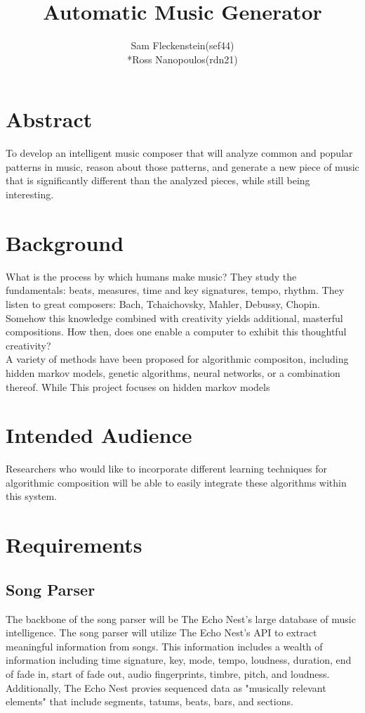 \documentclass{article}
\begin{document}
\title{Automatic Music Generator}
\author{Sam Fleckenstein(sef44)\\*Ross Nanopoulos(rdn21)}
\maketitle
\newpage

\tableofcontents
\newpage

\section{Abstract}
To develop an intelligent music composer that will analyze common and popular patterns in music, reason about those patterns, and generate a new piece of music that is significantly different than the analyzed pieces, while still being interesting.

\section{Background}
What is the process by which humans make music?  They study the fundamentals: beats, measures, time and key signatures, tempo, rhythm.  They listen to great composers: Bach, Tchaichovsky, Mahler, Debussy, Chopin.  Somehow this knowledge combined with creativity yields additional, masterful compositions.  How then, does one enable a computer to exhibit this thoughtful creativity?
\\
A variety of methods have been proposed for algorithmic compositon, including hidden markov models, genetic algorithms, neural networks, or a combination thereof.  While This project focuses on hidden markov models 

\section{Intended Audience}
Researchers who would like to incorporate different learning techniques for algorithmic composition will be able to easily integrate these algorithms within this system.

\section{Requirements}
\subsection{Song Parser}
The backbone of the song parser will be The Echo Nest's large database of music intelligence.  The song parser will utilize The Echo Nest's API to extract meaningful information from songs.  This information includes a wealth of information including time signature, key, mode, tempo, loudness, duration, end of fade in, start of fade out, audio fingerprints, timbre, pitch, and loudness.  Additionally, The Echo Nest provies sequenced data as "musically relevant elements" that include segments, tatums, beats, bars, and sections.
\end{document}

